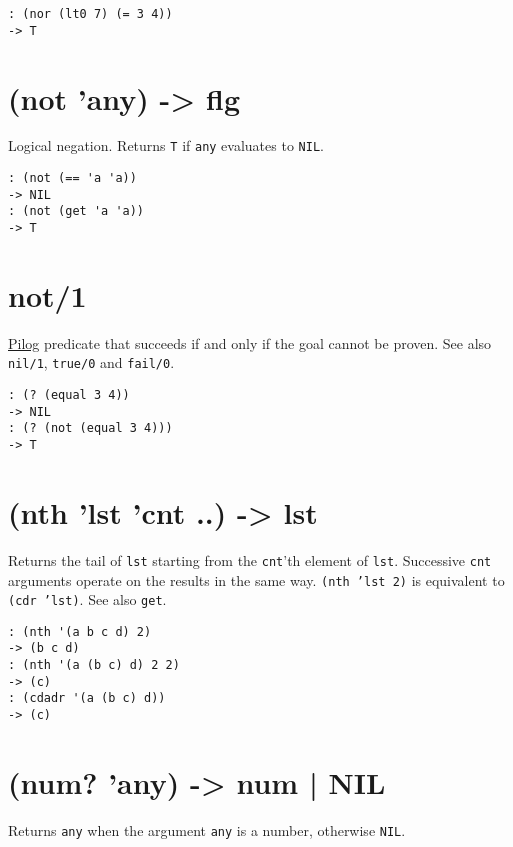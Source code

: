{{{{{{{\begin{verbatim}
: (nor (lt0 7) (= 3 4))
-> T
\end{verbatim}

 
\section{(not 'any) -> flg}
\label{sec-8-1-14-18}


Logical negation. Returns \texttt{T} if \texttt{any} evaluates to \texttt{NIL}.


\begin{verbatim}
: (not (== 'a 'a))
-> NIL
: (not (get 'a 'a))
-> T
\end{verbatim}

 
\section{not/1}
\label{sec-8-1-14-19}


\hyperref[ref.html-pilog]{Pilog} predicate that succeeds if and only if the
goal cannot be proven. See also \texttt{nil/1}, \texttt{true/0} and \texttt{fail/0}.


\begin{verbatim}
: (? (equal 3 4))
-> NIL
: (? (not (equal 3 4)))
-> T
\end{verbatim}

 
\section{(nth 'lst 'cnt ..) -> lst}
\label{sec-8-1-14-20}


Returns the tail of \texttt{lst} starting from the \texttt{cnt}'th element of \texttt{lst}.
Successive \texttt{cnt} arguments operate on the results in the same way.
\texttt{(nth 'lst 2)} is equivalent to \texttt{(cdr 'lst)}. See also \texttt{get}.


\begin{verbatim}
: (nth '(a b c d) 2)
-> (b c d)
: (nth '(a (b c) d) 2 2)
-> (c)
: (cdadr '(a (b c) d))
-> (c)
\end{verbatim}

 
\section{(num? 'any) -> num | NIL}
\label{sec-8-1-14-21}


Returns \texttt{any} when the argument \texttt{any} is a number, otherwise \texttt{NIL}.


}}}}}}}
